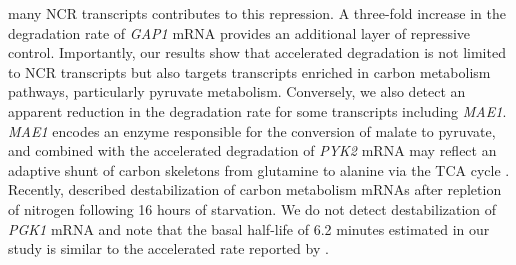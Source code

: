 many NCR transcripts \parencite{godard2007effect} contributes to this
repression. 
A three-fold increase in
the degradation rate of \textit{GAP1} mRNA provides an additional layer of
repressive control. Importantly, our results show that accelerated
degradation is not limited to NCR transcripts but also targets
transcripts enriched in carbon metabolism pathways, particularly
pyruvate metabolism. Conversely, we also detect an apparent reduction in the 
degradation rate for some transcripts 
including \textit{MAE1}. \textit{MAE1} encodes
an enzyme responsible for the conversion of malate to pyruvate, and
combined with the accelerated degradation of \textit{PYK2} mRNA 
may reflect an adaptive shunt of carbon skeletons from glutamine 
to alanine via the TCA cycle \parencite{boles1998identification}. 
Recently, \cite{tesniere2017relief}
described destabilization  of carbon metabolism mRNAs after repletion
of nitrogen following 16 hours of starvation. We do
not detect destabilization of \textit{PGK1} mRNA and note that
the basal half-life of 6.2 minutes estimated in our study is similar
to the accelerated rate reported by \cite{tesniere2017relief}.



